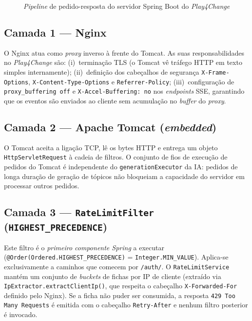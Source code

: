 \begin{figure}[htbp]
  \caption{\textit{Pipeline} de pedido-resposta do servidor Spring Boot do \textit{Play4Change}}
  \label{fig:pipeline_spring}
\end{figure}

\subsection*{Camada 1 — Nginx}

O Nginx atua como \textit{proxy} inverso à frente do Tomcat.
As suas responsabilidades no \textit{Play4Change} são:
(i)~terminação TLS (o Tomcat vê tráfego HTTP em texto simples internamente);
(ii)~definição dos cabeçalhos de segurança \texttt{X-Frame-Options},
\texttt{X-Content-Type-Options} e \texttt{Referrer-Policy};
(iii)~configuração de \texttt{proxy\_buffering off} e
\texttt{X-Accel-Buffering: no} nos \textit{endpoints} SSE, garantindo
que os eventos são enviados ao cliente sem acumulação no \textit{buffer}
do \textit{proxy}.

\subsection*{Camada 2 — Apache Tomcat (\textit{embedded})}

O Tomcat aceita a ligação TCP, lê os bytes HTTP e entrega um objeto
\texttt{HttpServletRequest} à cadeia de filtros.
O conjunto de fios de execução de pedidos do Tomcat é independente do
\texttt{generationExecutor} da IA: pedidos de longa duração de geração
de tópicos não bloqueiam a capacidade do servidor em processar outros
pedidos.

\subsection*{Camada 3 — \texttt{RateLimitFilter} (\texttt{HIGHEST\_PRECEDENCE})}

Este filtro é o \emph{primeiro componente Spring} a executar
(\texttt{@Order(Ordered.HIGHEST\_PRECEDENCE)} = \texttt{Integer.MIN\_VALUE}).
Aplica-se exclusivamente a caminhos que comecem por \texttt{/auth/}.
O \texttt{RateLimitService} mantém um conjunto de \textit{buckets}
de fichas por IP de cliente (extraído via \texttt{IpExtractor.extractClientIp()},
que respeita o cabeçalho \texttt{X-Forwarded-For} definido pelo Nginx).
Se a ficha não puder ser consumida, a resposta \texttt{429 Too Many
Requests} é emitida com o cabeçalho \texttt{Retry-After} e nenhum
filtro posterior é invocado.

